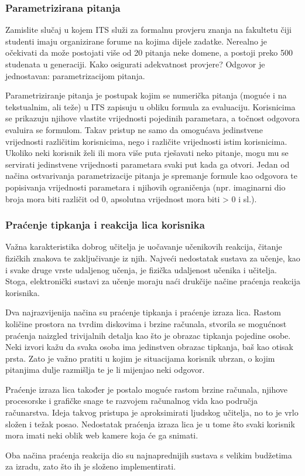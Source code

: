 \documentclass[times, utf8, zavrsni, numeric]{fer}
\begin{document}
\subsubsection{Parametrizirana pitanja}
Zamislite slučaj u kojem ITS služi za formalnu provjeru znanja na fakultetu čiji studenti imaju organizirane forume na kojima dijele zadatke. Nerealno je očekivati da može postojati više od 20 pitanja neke domene, a postoji preko 500 studenata u generaciji. Kako osigurati adekvatnost provjere? Odgovor je jednostavan: parametrizacijom pitanja.
\par
Parametriziranje pitanja je postupak kojim se numerička pitanja (moguće i na tekstualnim, ali teže) u ITS zapisuju u obliku formula za evaluaciju. Korisnicima se prikazuju njihove vlastite vrijednosti pojedinih parametara, a točnost odgovora evaluira se formulom. Takav pristup ne samo da omogućava jedinstvene vrijednosti različitim korisnicima, nego i različite vrijednosti istim korisnicima. Ukoliko neki korisnik želi ili mora više puta rješavati neko pitanje, mogu mu se servirati jedinstvene vrijednosti parametara svaki put kada ga otvori. Jedan od načina ostvarivanja parametrizacije pitanja je spremanje formule kao odgovora te popisivanja vrijednosti parametara i njihovih ograničenja (npr. imaginarni dio broja mora biti različit od 0, apsolutna vrijednost mora biti > 0 i sl.).

\subsubsection{Praćenje tipkanja i reakcija lica korisnika}
Važna karakteristika dobrog učitelja je uočavanje učenikovih reakcija, čitanje fizičkih znakova te zaključivanje iz njih. Najveći nedostatak sustava za učenje, kao i svake druge vrste udaljenog učenja, je fizička udaljenost učenika i učitelja. Stoga, elektronički sustavi za učenje moraju naći drukčije načine praćenja reakcija korisnika.
\par
Dva najrazvijenija načina su praćenje tipkanja i praćenje izraza lica. Rastom količine prostora na tvrdim diskovima i brzine računala, stvorila se mogućnost praćenja naizgled trivijalnih detalja kao što je obrazac tipkanja pojedine osobe. Neki izvori kažu da svaka osoba ima jedinstven obrazac tipkanja, baš kao otisak prsta. Zato je važno pratiti u kojim je situacijama korisnik ubrzan, o kojim pitanjima dulje razmišlja te je li mijenjao neki odgovor.
\par
Praćenje izraza lica također je postalo moguće rastom brzine računala, njihove procesorske i grafičke snage te razvojem računalnog vida kao područja računarstva. Ideja takvog pristupa je aproksimirati ljudskog učitelja, no to je vrlo složen i težak posao. Nedostatak praćenja izraza lica je u tome što svaki korisnik mora imati neki oblik web kamere koja će ga snimati.
\par
Oba načina praćenja reakcija dio su najnaprednijih sustava s velikim budžetima za izradu, zato što ih je složeno implementirati. 
\end{document}
